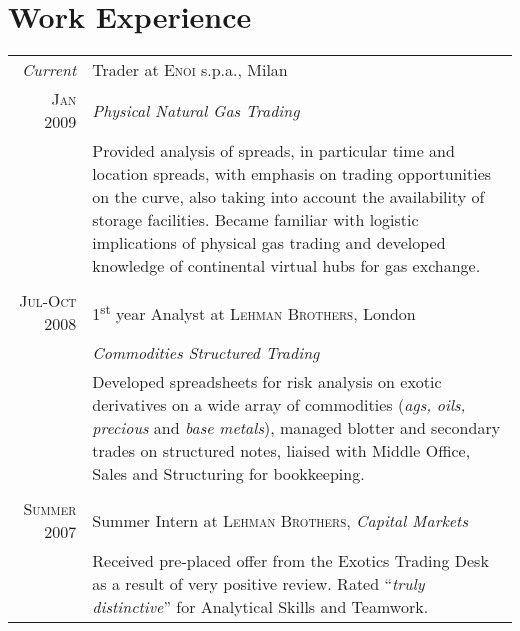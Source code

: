 \documentclass[a4paper,10pt]{article}
\begin{document}
\section{Work Experience}
\begin{tabular}{r|p{11cm}}
 \emph{Current} & Trader at \textsc{Enoi} s.p.a., Milan \\\textsc{Jan 2009}&\emph{Physical Natural Gas Trading}\\&\footnotesize{Provided analysis of spreads, in particular time and location spreads, with emphasis on trading opportunities on the curve, also taking into account the availability of storage facilities. Became familiar with logistic implications of physical gas trading and developed knowledge of continental virtual hubs for gas exchange.}\\\multicolumn{2}{c}{} \\
 \textsc{Jul-Oct 2008} & 1\textsuperscript{st} year Analyst at \textsc{Lehman Brothers}, London \\&\emph{Commodities Structured Trading}\\&\footnotesize{Developed spreadsheets for risk analysis on exotic derivatives on a wide array of commodities (\textit{ags, oils, precious} and \textit{base metals}), managed blotter and secondary trades on structured notes, liaised with Middle Office, Sales and Structuring for bookkeeping.}\\\multicolumn{2}{c}{} \\
\textsc{Summer 2007} & Summer Intern at \textsc{Lehman Brothers}, \emph{Capital Markets}\\&\footnotesize{Received pre-placed offer from the Exotics Trading Desk as a result of very positive review. Rated ``\emph{truly distinctive}'' for Analytical Skills and Teamwork.}
\end{tabular}

\end{document}
